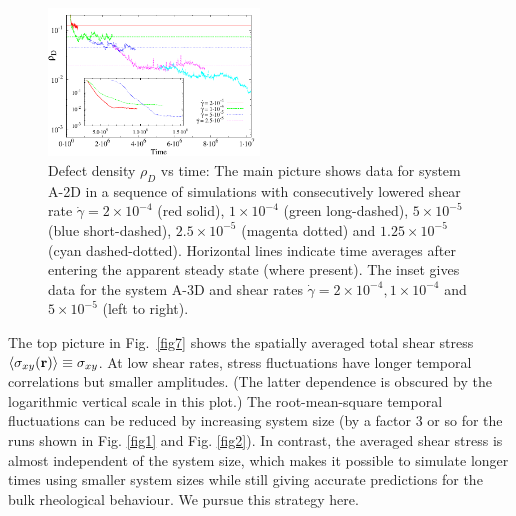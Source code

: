 \documentclass[8.5pt,twoside,twocolumn]{article}
\newcommand{\e}[1]{\times10^{#1}}
\begin{document}
\begin{figure}[htp]
\centering
\includegraphics[angle=0,width=0.5\textwidth]{defect_density_5e-4.pdf}
\caption{Defect density $\rho_D$ vs time: The main picture shows data for system A-2D in a sequence of simulations with consecutively lowered shear rate $\dot{\gamma}=2\e{-4}$ (red solid), $1\e{-4}$ (green long-dashed),  $5\e{-5}$ (blue short-dashed),  $2.5\e{-5}$ (magenta dotted) and  $1.25\e{-5}$ (cyan dashed-dotted). Horizontal lines indicate time averages after entering the apparent steady state (where present). The inset gives data for the system A-3D and shear rates $\dot{\gamma}=2\times10^{-4}, 1\times10^{-4}$ and $5\times10^{-5}$ (left to right).} 
\label{fig6}
\end{figure}


The top picture in Fig.~\ref{fig7} shows the spatially averaged total shear stress $\langle \sigma_{xy}({\bf r})\rangle \equiv\sigma_{xy} $.
At low shear rates, stress fluctuations have longer temporal correlations but smaller amplitudes. (The latter dependence is obscured by the logarithmic vertical scale in this plot.) The root-mean-square temporal fluctuations can be reduced by increasing system size (by a factor 3 or so for the runs shown in Fig. \ref{fig1} and Fig. \ref{fig2}). In contrast, the averaged shear stress is almost independent of the system size, which makes it possible to simulate longer times using smaller system sizes while still giving accurate predictions for the bulk rheological behaviour. 
We pursue this strategy here.
\end{document}
